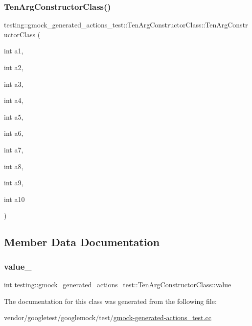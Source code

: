 \subsubsection{\texorpdfstring{Ten\+Arg\+Constructor\+Class()}{TenArgConstructorClass()}}
{\footnotesize\ttfamily testing\+::gmock\+\_\+generated\+\_\+actions\+\_\+test\+::\+Ten\+Arg\+Constructor\+Class\+::\+Ten\+Arg\+Constructor\+Class (\begin{DoxyParamCaption}\item[{int}]{a1,  }\item[{int}]{a2,  }\item[{int}]{a3,  }\item[{int}]{a4,  }\item[{int}]{a5,  }\item[{int}]{a6,  }\item[{int}]{a7,  }\item[{int}]{a8,  }\item[{int}]{a9,  }\item[{int}]{a10 }\end{DoxyParamCaption})\hspace{0.3cm}{\ttfamily [inline]}}



\subsection{Member Data Documentation}
\mbox{\label{classtesting_1_1gmock__generated__actions__test_1_1_ten_arg_constructor_class_ae3c388fd7e3cfbb95196712076a368ad}} 
\subsubsection{\texorpdfstring{value\+\_\+}{value\_}}
{\footnotesize\ttfamily int testing\+::gmock\+\_\+generated\+\_\+actions\+\_\+test\+::\+Ten\+Arg\+Constructor\+Class\+::value\+\_\+}



The documentation for this class was generated from the following file\+:\begin{DoxyCompactItemize}
\item 
vendor/googletest/googlemock/test/\hyperlink{gmock-generated-actions__test_8cc}{gmock-\/generated-\/actions\+\_\+test.\+cc}\end{DoxyCompactItemize}
